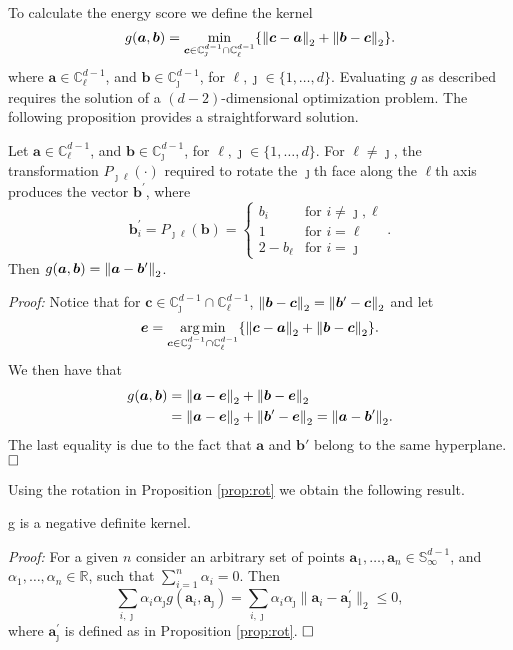 To calculate the energy score we define the kernel 
    \[  
    g(\bm{a},\bm{b}) = \min_{\bm{c} \in{\mathbb C}_{\jmath}^{d-1}\cap{\mathbb C}_{\ell}^{d-1}}\left\{ 
        \pnorm{\bm{c}-\bm{a}}{2} + \pnorm{\bm{b}-\bm{c}}{2} \right\}.
    \]
    where $\bm{a} \in {\mathbb C}_{\ell}^{d-1}$, and 
    $\bm{b} \in {\mathbb   C}_{\jmath}^{d-1}$, for $\ell,\jmath\in \{1,\ldots, d\}$.
Evaluating $g$ as described requires the solution of a $(d-2)$-dimensional 
  optimization problem.  The following proposition provides a straightforward solution.
\begin{prop}\label{prop:rot}
    Let $\bm{a} \in {\mathbb C}_{\ell}^{d-1}$, and $\bm{b} \in {\mathbb C}_{\jmath}^{d-1}$, 
        for $\ell, \jmath \in \{1, \ldots , d\}$.  For $\ell\neq \jmath$, the 
  transformation $P_{\jmath\ell}(\cdot)$ required to rotate the $\jmath$th face along the 
  $\ell$th axis produces the vector $\bm{b}^\prime$, where
  \begin{equation}
    \label{eqn:rotation}
     \bm{b}^{\prime}_i = P_{\jmath\ell}(\bm{b}) = 
    \begin{cases}
        b_{i} &\text{for }i\neq \jmath,\ell\\
        1 &\text{for }i = \ell\\
        2 - b_{\ell} &\text{for }i = \jmath
    \end{cases}.
  \end{equation}
  Then $g(\bm{a},\bm{b}) = \pnorm{\bm{a} - \bm{b}^{\prime}}{2}$.
\end{prop}
{\em Proof:}
Notice that for 
  $\bm{c} \in {\mathbb C}_{\jmath}^{d-1}\cap{\mathbb C}_{\ell}^{d-1}$,
     $\pnorm{\bm{b} - \bm{c}}{2} =  \pnorm{\bm{b}^{\prime} - \bm{c}}{2}$ and let
\[\bm{e} = 
    \argmin_{\bm{c} \in{\mathbb C}_{\jmath}^{d-1}\cap{\mathbb C}_{\ell}^{d-1}}\left\{ 
        \pnorm{\bm{c}-\bm{a}}{2} + \pnorm{\bm{b}-\bm{c}}{2} \right\}.
\]
We then have that
  \begin{equation*}
    \begin{aligned}
    g(\bm{a}, \bm{b}) &= \pnorm{\bm{a} - \bm{e}}{2} + \pnorm{\bm{b} - \bm{e}}{2}\\
    &= \pnorm{\bm{a} - \bm{e}}{2} + \pnorm{\bm{b}^{\prime} 
        - \bm{e}}{2} = \pnorm{\bm{a} - \bm{b}^{\prime}}{2}.
    \end{aligned}
  \end{equation*}
  The last equality is due to the fact that $\bm{a}$ and $\bm{b}'$ belong to the 
  same hyperplane. $\hfill\Box$
    
Using the rotation in Proposition \ref{prop:rot} we obtain the following result.
    \begin{prop}\label{prop:g}
    g is a negative definite kernel.
    \end{prop}
    {\em Proof:} For a given $n$ consider an arbitrary set of points
    $\bm{a}_1, \ldots , \bm{a}_n \in {\mathbb S}_\infty^{d-1}$, and 
    $\alpha_1, \ldots , \alpha_n \in {\mathbb R}$, such that $\sum_{i=1}^n
    \alpha _i = 0$. Then
    \[
    \sum_{i,\jmath} \alpha_i \alpha_\jmath g(\bm{a}_i, \bm{a}_\jmath) 
        = \sum_{i,\jmath} \alpha_i \alpha_\jmath 
    \|\bm{a}_i - \bm{a}_\jmath^\prime\|_2 \leq 0,
    \]
    where $\bm{a}_\jmath^\prime$ is defined as in Proposition \ref{prop:rot}. $\hfill\Box$

